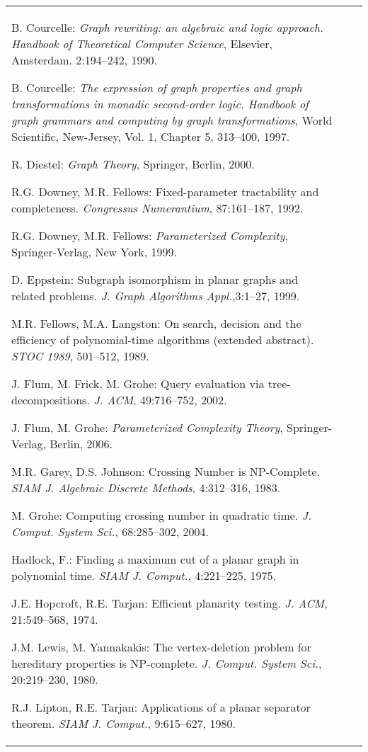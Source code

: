 \documentclass{llncs}
\begin{document}
\begin{center}
{{\begin{tabular}{llp{10.3cm}}
\begin{thebibliography}{99}
\bibitem{cou90}
B. Courcelle: \emph{Graph rewriting: an algebraic and logic approach. Handbook of Theoretical Computer Science},
Elsevier, Amsterdam.  2:194--242, 1990.

\bibitem{cou97}
B. Courcelle:
\emph{The expression of graph properties and graph transformations in monadic second-order logic.
Handbook of graph grammars and computing by graph transformations}, World Scientific, New-Jersey,
Vol. 1, Chapter 5, 313--400, 1997.

\bibitem{die00}
R. Diestel: \emph{Graph Theory}, Springer, Berlin, 2000.

\bibitem{dow92}
R.G. Downey, M.R. Fellows: Fixed-parameter tractability and completeness.
\emph{Congressus Numerantium}, 87:161--187, 1992.

\bibitem{dow99}
R.G. Downey, M.R. Fellows:
\emph{Parameterized Complexity}, Springer-Verlag, New York, 1999.

\bibitem{epp99}
D. Eppstein:
Subgraph isomorphism in planar graphs and related problems.
\emph{J. Graph Algorithms Appl.},3:1--27, 1999.

\bibitem{fel89}
M.R. Fellows, M.A. Langston:
On search, decision and the efficiency of polynomial-time algorithms (extended abstract).
\emph{STOC 1989}, 501--512, 1989.

\bibitem{flu02}
J. Flum, M. Frick, M. Grohe:
Query evaluation via tree-decompositions.
\emph{J. ACM}, 49:716--752, 2002.

\bibitem{flu06}
J. Flum, M. Grohe:  \emph{Parameterized Complexity Theory}, Springer-Verlag, Berlin, 2006.

\bibitem{gar83}
M.R. Garey, D.S. Johnson: Crossing Number is NP-Complete.
\emph{SIAM J. Algebraic Discrete Methods}, 4:312--316, 1983.

\bibitem{gro04}
M. Grohe: Computing crossing number in quadratic time.
\emph{J. Comput. System Sci.}, 68:285--302, 2004.

\bibitem{had75}
Hadlock, F.:
Finding a maximum cut of a planar graph in polynomial time.
\emph{SIAM J. Comput.}, 4:221--225, 1975.

\bibitem{hop74}
J.E. Hopcroft, R.E. Tarjan:
Efficient planarity testing.
\emph{J. ACM}, 21:549--568, 1974.

\bibitem{lew80}
J.M. Lewis, M. Yannakakis:
The vertex-deletion problem for hereditary properties is NP-complete.
\emph{J. Comput. System Sci.}, 20:219--230, 1980.

\bibitem{lip80}
R.J. Lipton, R.E. Tarjan:
Applications of a planar separator theorem.
\emph{SIAM J. Comput.}, 9:615--627, 1980.


\end{thebibliography}
\end{tabular}}}
\end{center}
\end{document}
